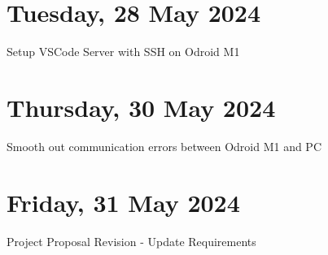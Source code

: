 \section[2024/05/28]{Tuesday, 28 May 2024}
Setup VSCode Server with SSH on Odroid M1
\pendsign

\section[2024/05/30]{Thursday, 30 May 2024}
Smooth out communication errors between Odroid M1 and PC
\pendsign

\section[2024/05/31]{Friday, 31 May 2024}
Project Proposal Revision - Update Requirements
\pendsign





